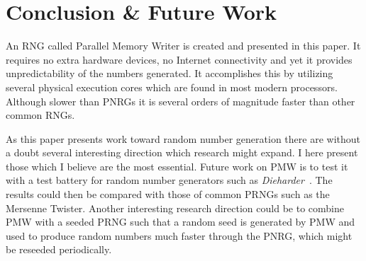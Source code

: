 \section{Conclusion \& Future Work}
\label{sec:conclusion}
An RNG called Parallel Memory Writer is created and presented in this paper.
It requires no extra hardware devices, no Internet connectivity and yet it provides unpredictability of the numbers generated.
It accomplishes this by utilizing several physical execution cores which are found in most modern processors.
Although slower than PNRGs it is several orders of magnitude faster than other common RNGs.

As this paper presents work toward random number generation there are without a doubt several interesting direction which research might expand.
I here present those which I believe are the most essential.
Future work on PMW is to test it with a test battery for random number generators such as \emph{Dieharder}~\citep{dieharder}.
The results could then be compared with those of common PRNGs such as the Mersenne Twister.
Another interesting research direction could be to combine PMW with a seeded PRNG such that a random seed is generated by PMW and used to produce random numbers much faster through the PNRG, which might be reseeded periodically.